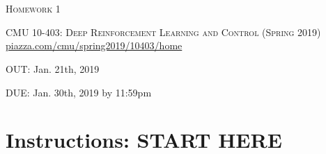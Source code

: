 \documentclass[12pt]{article}
\begin{document}
\section*{}
\begin{center}
  \centerline{\textsc{\LARGE  Homework 1}}
  \vspace{1em}
  \textsc{\large CMU 10-403: Deep Reinforcement Learning and Control (Spring 2019)} \\
  \url{piazza.com/cmu/spring2019/10403/home}
  \centerline{OUT: Jan. 21th, 2019}
  \centerline{DUE: Jan. 30th, 2019 by 11:59pm}
\end{center}

\section*{Instructions: START HERE}
\end{document}
